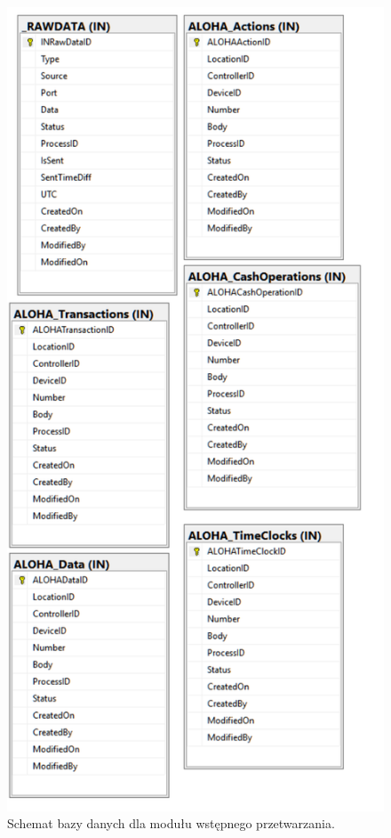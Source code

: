 \documentclass[a4paper]{book}
\begin{document}
\begin{figure}[t]
	\includegraphics[width=\textwidth]{./img/preparser_database_schema.png}
	\caption{Schemat bazy danych dla modułu wstępnego przetwarzania.}
	\label{fig:preparser_database_schema}
\end{figure}
\end{document}
